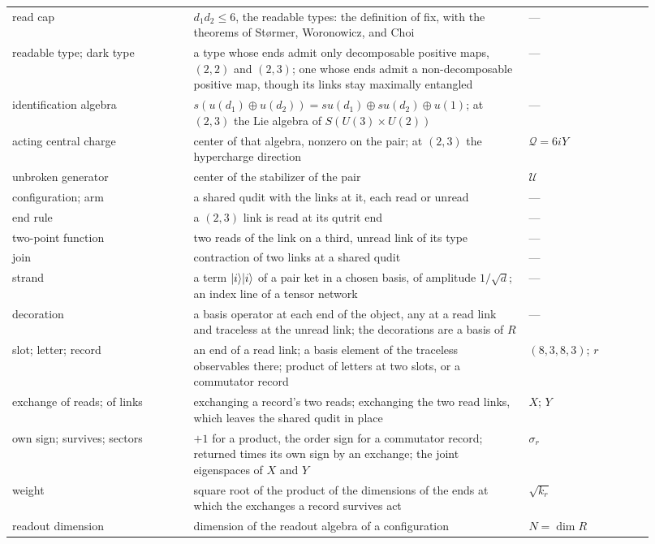 \begin{table}[h]
\begin{ruledtabular}
\begin{tabular}{p{0.26\linewidth}p{0.48\linewidth}p{0.18\linewidth}}
read cap & $d_{1}d_{2}\leq 6$, the readable types: the definition of fix, with the theorems of St{\o}rmer, Woronowicz, and Choi & --- \\
readable type; dark type & a type whose ends admit only decomposable positive maps, $(2,2)$ and $(2,3)$; one whose ends admit a non-decomposable positive map, though its links stay maximally entangled & --- \\
identification algebra & $s(u(d_{1})\oplus u(d_{2}))=su(d_{1})\oplus su(d_{2})\oplus u(1)$; at $(2,3)$ the Lie algebra of $S(U(3)\times U(2))$ & --- \\
acting central charge & center of that algebra, nonzero on the pair; at $(2,3)$ the hypercharge direction & $\mathcal{Q}=6iY$ \\
unbroken generator & center of the stabilizer of the pair & $\mathcal{U}$ \\
configuration; arm & a shared qudit with the links at it, each read or unread & --- \\
end rule & a $(2,3)$ link is read at its qutrit end & --- \\
two-point function & two reads of the link on a third, unread link of its type & --- \\
join & contraction of two links at a shared qudit & --- \\
strand & a term $|i\rangle|i\rangle$ of a pair ket in a chosen basis, of amplitude $1/\sqrt{d}$; an index line of a tensor network & --- \\
decoration & a basis operator at each end of the object, any at a read link and traceless at the unread link; the decorations are a basis of $R$ & --- \\
slot; letter; record & an end of a read link; a basis element of the traceless observables there; product of letters at two slots, or a commutator record & $(8,3,8,3)$; $r$ \\
exchange of reads; of links & exchanging a record's two reads; exchanging the two read links, which leaves the shared qudit in place & $X$; $Y$ \\
own sign; survives; sectors & $+1$ for a product, the order sign for a commutator record; returned times its own sign by an exchange; the joint eigenspaces of $X$ and $Y$ & $\sigma_{r}$ \\
weight & square root of the product of the dimensions of the ends at which the exchanges a record survives act & $\sqrt{k_{r}}$ \\
readout dimension & dimension of the readout algebra of a configuration & $N=\dim R$ \\

\end{tabular}
\end{ruledtabular}
\end{table}
